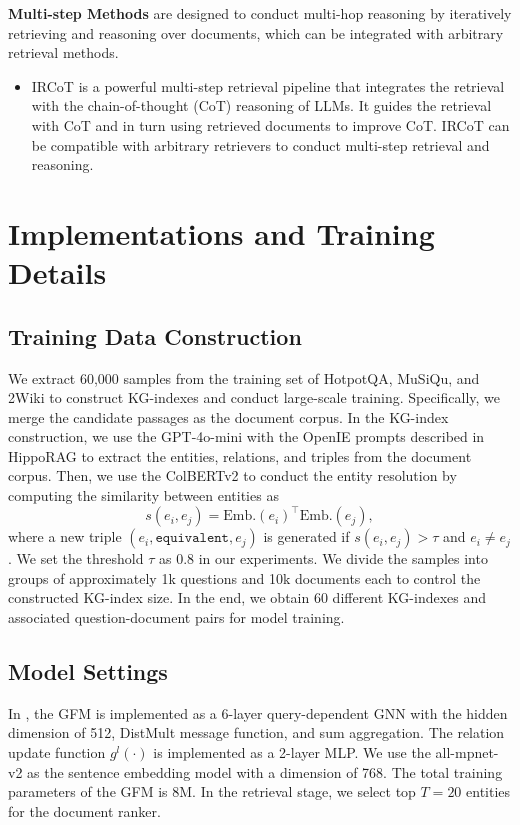 \noindent\textbf{Multi-step Methods} are designed to conduct multi-hop reasoning by iteratively retrieving and reasoning over documents, which can be integrated with arbitrary retrieval methods.
\begin{itemize}
    \item IRCoT \cite{trivedi2023interleaving} is a powerful multi-step retrieval pipeline that integrates the retrieval with the chain-of-thought (CoT) reasoning of LLMs. It guides the retrieval with CoT and in turn using retrieved documents to improve CoT. IRCoT can be compatible with arbitrary retrievers to conduct multi-step retrieval and reasoning.
\end{itemize}

\section{Implementations and Training Details}\label{app:implementation}

\subsection{Training Data Construction}\label{app:kg_index}
We extract 60,000 samples from the training set of HotpotQA, MuSiQu, and 2Wiki to construct KG-indexes and conduct large-scale training. Specifically, we merge the candidate passages as the document corpus. In the KG-index construction, we use the GPT-4o-mini \cite{gpt4o} with the OpenIE prompts described in HippoRAG \cite{gutiérrez2024hipporag} to extract the entities, relations, and triples from the document corpus. Then, we use the ColBERTv2 \cite{santhanam2022colbertv2} to conduct the entity resolution by computing the similarity between entities as
\begin{equation}
    s(e_i, e_j) = \text{Emb.}(e_i)^{\top} \text{Emb.}(e_j), 
\end{equation}
where a new triple $(e_i, \texttt{equivalent}, e_j)$ is generated if $s(e_i, e_j) > \tau$ and $e_i \neq e_j$. We set the threshold $\tau$ as 0.8 in our experiments. We divide the samples into groups of approximately 1k questions and 10k documents each to control the constructed KG-index size. In the end, we obtain 60 different KG-indexes and associated question-document pairs for model training.

\subsection{Model Settings}\label{app:model_settings}
In \ourmethod, the GFM is implemented as a 6-layer query-dependent GNN with the hidden dimension of 512, DistMult message function, and sum aggregation. The relation update function $g^{l}(\cdot)$ is implemented as a 2-layer MLP. We use the all-mpnet-v2 as the sentence embedding model with a dimension of 768. The total training parameters of the GFM is 8M. In the retrieval stage, we select top $T=20$ entities for the document ranker.

